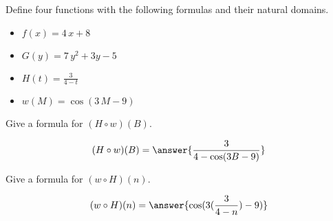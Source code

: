 \documentclass{ximera}
\author{Lee Wayand}
\begin{document}
\begin{exercise}




Define four functions with the following formulas and their natural domains. \\


\begin{itemize}
  \item $f(x) = 4 \, x + 8$
  \item $G(y) = 7 \, y^2 + 3 y - 5$
  \item $H(t) = \frac{3}{4 - t}$
  \item $w(M) = \cos(3 \, M - 9)$ 
\end{itemize}


\begin{question}


Give a formula for $(H \circ w)(B)$.

\[
(H \circ w)(B) = \answer{\frac{3}{4-\cos(3B-9)}}
\]

\end{question}






\begin{question}


Give a formula for $(w \circ H)(n)$.

\[
(w \circ H)(n) = \answer{\cos(3(\frac{3}{4-n})-9)}
\]

\end{question}




\end{exercise}
\end{document}
